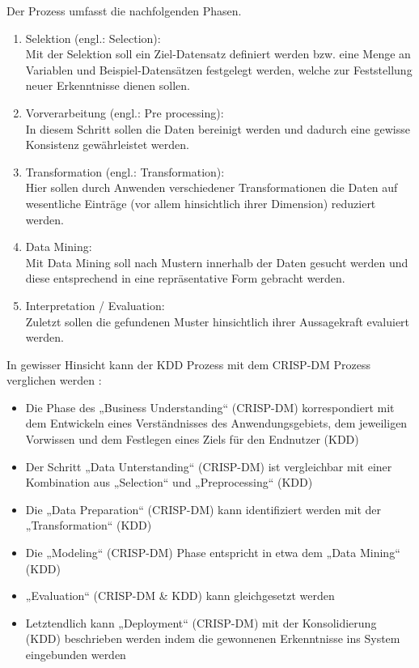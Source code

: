 Der Prozess umfasst die nachfolgenden Phasen.
\begin{enumerate}
  \item Selektion (engl.: Selection): \\
  Mit der Selektion soll ein Ziel-Datensatz definiert werden bzw. eine Menge an
  Variablen und Beispiel-Datensätzen festgelegt werden, welche zur Feststellung
  neuer Erkenntnisse dienen sollen.
  \item Vorverarbeitung (engl.: Pre processing): \\
  In diesem Schritt sollen die Daten bereinigt werden und dadurch eine gewisse
  Konsistenz gewährleistet werden.
  \item Transformation (engl.: Transformation):  \\
  Hier sollen durch Anwenden verschiedener Transformationen die Daten auf
  wesentliche Einträge (vor allem hinsichtlich ihrer Dimension) reduziert werden.
  \item Data Mining:  \\
  Mit Data Mining soll nach Mustern innerhalb der Daten gesucht werden und diese
  entsprechend in eine repräsentative Form gebracht werden.
  \item Interpretation / Evaluation:  \\
  Zuletzt sollen die gefundenen Muster hinsichtlich ihrer Aussagekraft evaluiert werden.
\end{enumerate}

In gewisser Hinsicht kann der KDD Prozess mit dem CRISP-DM Prozess verglichen
werden \cite{IPP}:
\begin{itemize}
  \item Die Phase des „Business Understanding“ (CRISP-DM) korrespondiert mit dem
  Entwickeln eines Verständnisses des Anwendungsgebiets, dem jeweiligen
  Vorwissen und dem Festlegen eines Ziels für den Endnutzer (KDD)
  \item Der Schritt „Data Unterstanding“ (CRISP-DM) ist vergleichbar mit einer
  Kombination aus „Selection“ und „Preprocessing“ (KDD)
  \item Die „Data Preparation“ (CRISP-DM) kann identifiziert werden mit der
  „Transformation“ (KDD)
  \item Die „Modeling“ (CRISP-DM) Phase entspricht in etwa dem „Data Mining“ (KDD)
  \item „Evaluation“ (CRISP-DM & KDD) kann gleichgesetzt werden
  \item Letztendlich kann „Deployment“ (CRISP-DM) mit der Konsolidierung (KDD)
  beschrieben werden indem die gewonnenen Erkenntnisse ins System eingebunden
  werden
\end{itemize}

